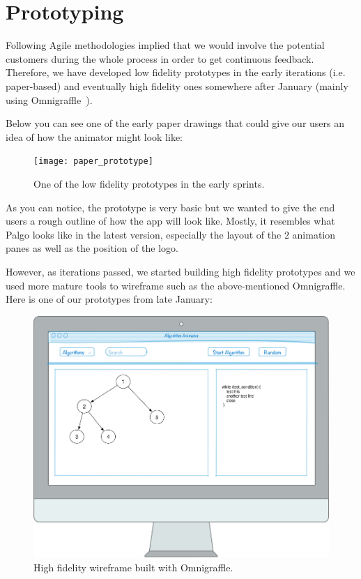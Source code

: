 \documentclass{l4proj}
\begin{document}
\section{Prototyping}

Following Agile methodologies implied that we would involve the potential customers during the whole process in order
to get continuous feedback. Therefore, we have developed low fidelity prototypes in the early iterations (i.e.
paper-based) and eventually high fidelity ones somewhere after January (mainly using Omnigraffle~\cite{omnigraffle}).

Below you can see one of the early paper drawings that could give our users an idea of how the animator might look
like:

\begin{figure}[!ht]
    \centering
    \texttt{[image: paper\_prototype]}
    \caption{One of the low fidelity prototypes in the early sprints.}
    \label{fig:paper_prototype}
\end{figure}

As you can notice, the prototype is very basic but we wanted to give the end users a rough outline of how the app will
look like. Mostly, it resembles what Palgo looks like in the latest version, especially the layout of the 2 animation
panes as well as the position of the logo.

However, as iterations passed, we started building high fidelity prototypes and we used more mature tools to wireframe
such as the above-mentioned Omnigraffle. Here is one of our prototypes from late January:

\begin{figure}[!ht]
    \centering
    \includegraphics[scale=0.3]{high_fidelity_prototype}
    \caption{High fidelity wireframe built with Omnigraffle.}
    \label{fig:high_fidelity_prototype}
\end{figure}
\end{document}
